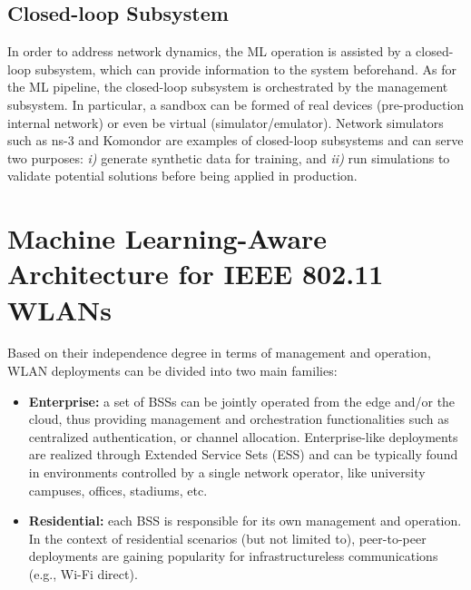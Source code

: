 \documentclass{article}
\begin{document}
\subsection{Closed-loop Subsystem} 
In order to address network dynamics, the ML operation is assisted by a closed-loop subsystem, which can provide information to the system beforehand. As for the ML pipeline, the closed-loop subsystem is orchestrated by the management subsystem. In particular, a sandbox can be formed of real devices (pre-production internal network) or even be virtual (simulator/emulator). Network simulators such as ns-3 and Komondor \cite{barrachina2019komondor} are examples of closed-loop subsystems and can serve two purposes: \emph{i)} generate synthetic data for training, and \emph{ii)} run simulations to validate potential solutions before being applied in production.

\section{Machine Learning-Aware Architecture for IEEE 802.11 WLANs}
\label{section:wlans_architecture}

Based on their independence degree in terms of management and operation, WLAN deployments can be divided into two main families:
\begin{itemize}
	\item \textbf{Enterprise:} a set of BSSs can be jointly operated from the edge and/or the cloud, thus providing management and orchestration functionalities such as centralized authentication, or channel allocation. Enterprise-like deployments are realized through Extended Service Sets (ESS) and can be typically found in environments controlled by a single network operator, like university campuses, offices, stadiums, etc. 
	\item \textbf{Residential:} each BSS is responsible for its own management and operation. In the context of residential scenarios (but not limited to), peer-to-peer deployments are gaining popularity for infrastructureless communications (e.g., Wi-Fi direct).
\end{itemize}
\end{document}
